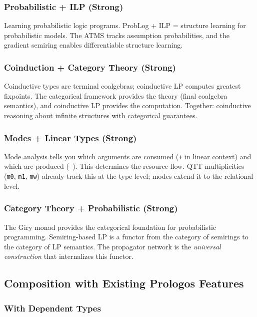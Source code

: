 \documentclass[11pt]{article}
\begin{document}
\subsubsection{Probabilistic + ILP (Strong)}
\label{sec:org4de463e}

Learning probabilistic logic programs. ProbLog + ILP = structure learning
for probabilistic models. The ATMS tracks assumption probabilities, and
the gradient semiring enables differentiable structure learning.
\subsubsection{Coinduction + Category Theory (Strong)}
\label{sec:org4ea9560}

Coinductive types are terminal coalgebras; coinductive LP computes greatest
fixpoints. The categorical framework provides the theory (final coalgebra
semantics), and coinductive LP provides the computation. Together: coinductive
reasoning about infinite structures with categorical guarantees.
\subsubsection{Modes + Linear Types (Strong)}
\label{sec:org8308b13}

Mode analysis tells you which arguments are consumed (\texttt{+} in linear context)
and which are produced (\texttt{-}). This determines the resource flow. QTT
multiplicities (\texttt{m0}, \texttt{m1}, \texttt{mw}) already track this at the type level;
modes extend it to the relational level.
\subsubsection{Category Theory + Probabilistic (Strong)}
\label{sec:org7fe1b8a}

The Giry monad provides the categorical foundation for probabilistic
programming. Semiring-based LP is a functor from the category of semirings
to the category of LP semantics. The propagator network is the \emph{universal
construction} that internalizes this functor.
\subsection{Composition with Existing Prologos Features}
\label{sec:orgb401b32}

\subsubsection{With Dependent Types}
\label{sec:org52548e7}
\end{document}
